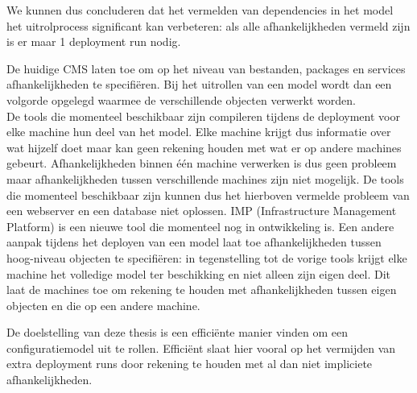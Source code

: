 We kunnen dus concluderen dat het vermelden van dependencies in het model het uitrolprocess significant kan verbeteren:
als alle afhankelijkheden vermeld zijn is er maar 1 deployment run nodig.

De huidige CMS laten toe om op het niveau van bestanden, packages en services afhankelijkheden te specifi\"eren.
Bij het uitrollen van een model wordt dan een volgorde opgelegd waarmee de verschillende objecten verwerkt worden.
\\
De tools die momenteel beschikbaar zijn compileren tijdens de deployment voor elke machine hun deel van het model.
Elke machine krijgt dus informatie over wat hijzelf doet maar kan geen rekening houden met wat er op andere machines gebeurt.
Afhankelijkheden binnen \'e\'en machine verwerken is dus geen probleem maar afhankelijkheden tussen verschillende machines zijn niet mogelijk. 
De tools die momenteel beschikbaar zijn kunnen dus het hierboven vermelde probleem van een webserver en een database niet oplossen.
IMP (Infrastructure Management Platform) is een nieuwe tool die momenteel nog in ontwikkeling is.
Een andere aanpak tijdens het deployen van een model laat toe afhankelijkheden tussen hoog-niveau objecten te specifi\"eren:
in tegenstelling tot de vorige tools krijgt elke machine het volledige model ter beschikking en niet alleen zijn eigen deel.
Dit laat de machines toe om rekening te houden met afhankelijkheden tussen eigen objecten en die op een andere machine.

De doelstelling van deze thesis is een effici\"ente manier vinden om een configuratiemodel uit te rollen.
Effici\"ent slaat hier vooral op het vermijden van extra deployment runs door rekening te houden met al dan niet impliciete afhankelijkheden.


